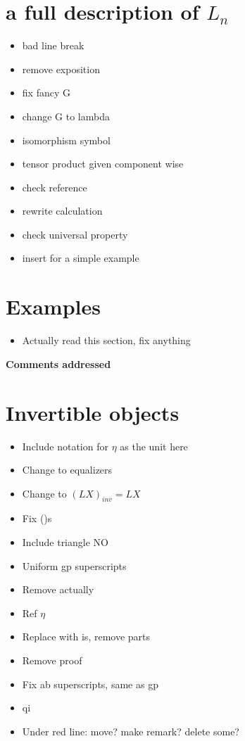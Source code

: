 \documentclass{amsart}
\begin{document}
\section{a full description of $L_n $}
\begin{itemize}
\item bad line break
\item remove exposition
\item fix fancy G
\item change G to lambda
\item isomorphism symbol
\item tensor product given component wise
\item check reference
\item rewrite calculation
\item check universal property
\item insert for a simple example
\end{itemize}
\section{ Examples}
\begin{itemize}
\item Actually read this section, fix anything
\end{itemize}
\newpage

\begin{center}
\begin{Large}
\textbf{Comments addressed}
\end{Large}
\end{center}
\vskip1cm


\section{ Invertible objects}
\begin{itemize}
\item Include notation for $\eta$ as the unit here
\item Change to equalizers
\item Change to $(LX)_{inv} = LX$
\item Fix ()s
\item Include triangle NO
\item Uniform gp superscripts
\item Remove actually
\item Ref $\eta$
\item Replace with is, remove parts
\item Remove proof
\item Fix ab superscripts, same as gp
\item qi
\item Under red line: move? make remark? delete some?
\end{itemize}
\end{document}
